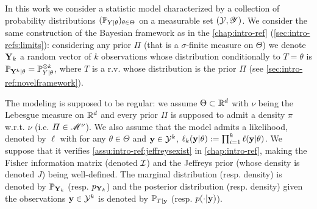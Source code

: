 



In this work we consider a statistic model characterized by a collection of probability distributions $(\mathbb{P}_{Y|\theta})_{\theta\in\Theta}$ on  a measurable set $(\mathcal{Y},\mathscr{Y})$. 
We consider the same construction of the Bayesian framework as in the \cref{chap:intro-ref} (\cref{sec:intro-refs:limits}): considering any prior $\varPi$ (that is a $\sigma$-finite measure on $\Theta$) we denote $\mathbf{Y}_k$ a random vector of $k$ observations whose distribution conditionally to $T=\theta$ is $\mathbb{P}_{\mathbf{Y}^k|\theta}=\mathbb{P}_{Y|\theta}^{\otimes k}$, where $T$ is a r.v. whose distribution is the prior $\varPi$ (see \cref{sec:intro-ref:novelframework}).

The modeling is supposed to be regular: we assume $\Theta\subset\mathbb{R}^d$ with $\nu$ being the Lebesgue measure on $\mathbb{R}^d$ and every prior $\varPi$ is supposed to admit a density $\pi$ w.r.t. $\nu$ (i.e. $\varPi\in\mathscr{M}^\nu$).
We also assume that the model admits a likelihood, denoted by $\ell$ with for any $\theta\in\Theta$ and $\mathbf{y}\in\mathcal{Y}^k$, $\ell_k(\mathbf{y}|\theta):= \prod_{i=1}^k\ell(\mathbf{y}|\theta)$. We suppose that it verifies \cref{assu:intro-ref:jeffreysexist} in \cref{chap:intro-ref}, making the Fisher information matrix (denoted $\mathcal{I}$) and the Jeffreys prior (whose density is denoted $J$) being well-defined.
The marginal distribution (resp. density)  is denoted by $\mathbb{P}_{\mathbf{Y}_k}$ (resp. $p_{\mathbf{Y}_k}$) and the posterior distribution (resp. density) given the observations $\mathbf{y}\in\mathcal{Y}^k$ is denoted by $\mathbb{P}_{T|\mathbf{y}}$ (resp. $p(\cdot|\mathbf{y})$).




